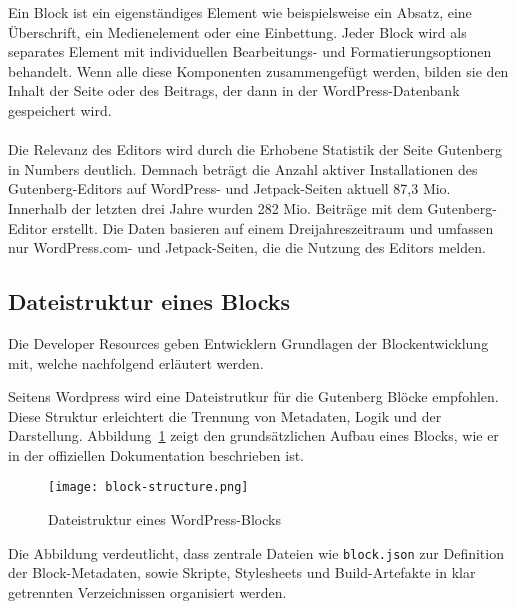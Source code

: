 Ein Block ist ein eigenständiges Element wie beispielsweise ein Absatz, eine Überschrift, ein Medienelement oder eine Einbettung.
Jeder Block wird als separates Element mit individuellen Bearbeitungs- und Formatierungsoptionen behandelt.
Wenn alle diese Komponenten zusammengefügt werden, bilden sie den Inhalt der Seite oder des Beitrags, der dann in der WordPress-Datenbank gespeichert wird.
\\
\\
Die Relevanz des Editors wird durch die Erhobene Statistik der Seite Gutenberg in Numbers deutlich.
Demnach beträgt die Anzahl aktiver Installationen des Gutenberg-Editors auf WordPress- und Jetpack-Seiten aktuell 87,3 Mio.
Innerhalb der letzten drei Jahre wurden 282 Mio. Beiträge mit dem Gutenberg-Editor erstellt.
Die Daten basieren auf einem Dreijahreszeitraum und umfassen nur WordPress.com- und Jetpack-Seiten, die die Nutzung des Editors melden.\cite{gutenstats}

\subsection{Dateistruktur eines Blocks}
Die Developer Resources geben Entwicklern Grundlagen der Blockentwicklung mit, welche nachfolgend erläutert werden.

Seitens Wordpress wird eine Dateistrutkur für die Gutenberg Blöcke empfohlen.
Diese Struktur erleichtert die Trennung von Metadaten, Logik und der Darstellung.
Abbildung~\ref{fig:block-structure} zeigt den grundsätzlichen Aufbau eines Blocks, wie er in der offiziellen Dokumentation beschrieben ist.

\begin{figure}[h!]
    \centering
    \texttt{[image: block-structure.png]} %
    \caption{Dateistruktur eines WordPress-Blocks \cite{wordpress2023}}
    \label{fig:block-structure}
\end{figure}

Die Abbildung verdeutlicht, dass zentrale Dateien wie \texttt{block.json} zur Definition der Block-Metadaten,
sowie Skripte, Stylesheets und Build-Artefakte in klar getrennten Verzeichnissen organisiert werden.



